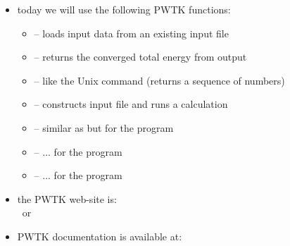 \documentclass[landscape]{foils}
\begin{document}
\begin{itemize}
\item today we will use the following PWTK functions:
  \begin{itemize}
  \item {} -- loads input data from an existing
     input file
    \vspace{0.2em}
  \item {} -- returns the converged total energy
    from  output\vspace{0.2em}
  \item {} -- like the Unix  command (returns a
    sequence of numbers)\vspace{0.2em}
  \item {} -- constructs  input file and runs a calculation
    \vspace{0.2em}
  \item {} -- similar as  but for the  program
    \vspace{0.2em}
  \item {} -- ... for the  program
    \vspace{0.2em}
  \item {} -- ... for the  program
  \end{itemize}
\item the PWTK web-site is:\\
   ~or~ 
  \item PWTK documentation is available at:\\
\end{itemize}
\end{document}
